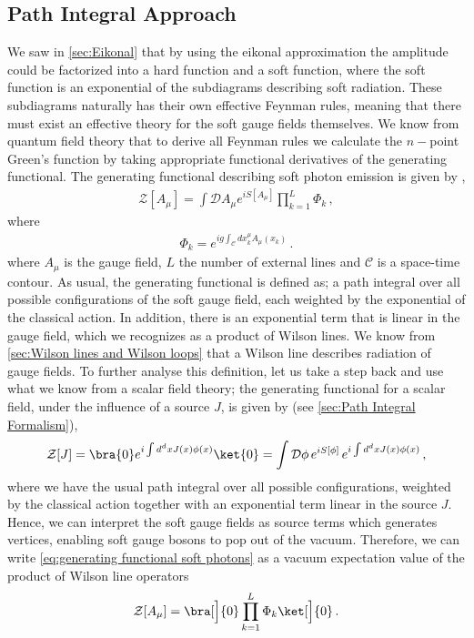 \subsection{Path Integral Approach}\label{sec:Path Integral Exponentiation}
We saw in \cref{sec:Eikonal} that by using the eikonal approximation the amplitude could be factorized into a hard function and a soft function, where the soft function is an exponential of the subdiagrams describing soft radiation. These subdiagrams naturally has their own effective Feynman rules, meaning that there must exist an effective theory for the soft gauge fields themselves. We know from quantum field theory that to derive all Feynman rules we calculate the $n-$point Green's function by taking appropriate functional derivatives of the generating functional. The generating functional describing soft photon emission is given by \cite{Laenen:2008gt},
\begin{align}\label{eq:generating functional soft photons}
    \mathcal{Z}[A_{\mu}]=\int \mathcal{D}A_{\mu}e^{iS[A_{\mu}]}\prod_{k=1}^{L}\Phi_k\,,
\end{align}
where
\begin{align}
    \Phi_k=e^{ig\int_{\mathcal{C}} dx^{\mu}_{k}A_{\mu}(x_k)}\,.
\end{align}
where $A_\mu$ is the gauge field, $L$ the number of external lines and $\mathcal{C}$ is a space-time contour. As usual, the generating functional is defined as; a path integral over all possible configurations of the soft gauge field, each weighted by the exponential of the classical action. In addition, there is an exponential term that is linear in the gauge field, which we recognizes as a product of Wilson lines. We know from \cref{sec:Wilson lines and Wilson loops} that a Wilson line describes radiation of gauge fields. To further analyse this definition, let us take a step back and use what we know from a scalar field theory; the generating functional for a scalar field, under the influence of a source $J$, is given by (see \cref{sec:Path Integral Formalism}),
\begin{align}
    \mathcal{Z}[J]=\bra{0}e^{i\int d^{d}x J(x)\phi(x)}\ket{0}=\int\mathcal{D}\phi\,e^{iS[\phi]}\,e^{i\int d^{d}x J(x)\phi(x)}\,,
\end{align}
where we have the usual path integral over all possible configurations, weighted by the classical action together with an exponential term linear in the source $J$. Hence, we can interpret the soft gauge fields as source terms which generates vertices, enabling soft gauge bosons to pop out of the vacuum. Therefore, we can write \cref{eq:generating functional soft photons} as a vacuum expectation value of the product of Wilson line operators
\begin{align}\label{eq:vev Wilson operators}
    \mathcal{Z}[A_{\mu}]=\bra[\Big]{0}\prod_{k=1}^{L}\Phi_k\ket[\Big]{0}\,.
\end{align}

